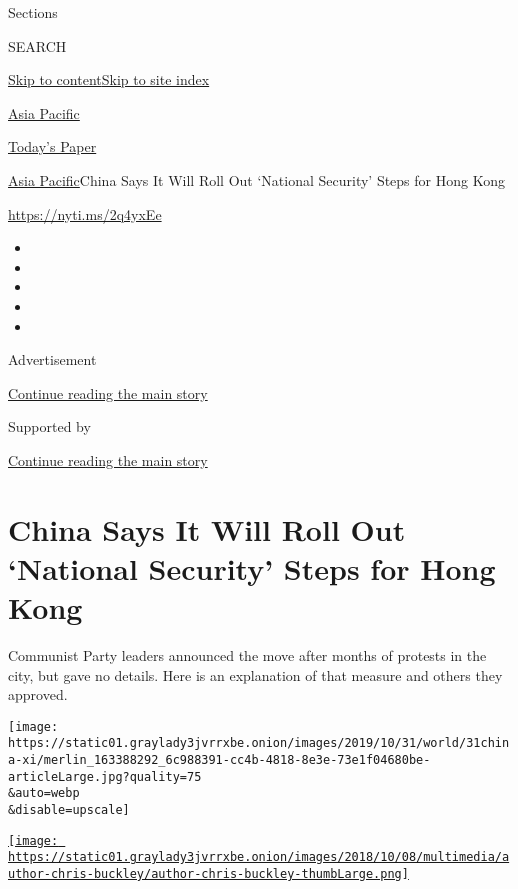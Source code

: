 Sections

SEARCH

\protect\hyperlink{site-content}{Skip to
content}\protect\hyperlink{site-index}{Skip to site index}

\href{https://www.nytimes3xbfgragh.onion/section/world/asia}{Asia
Pacific}

\href{https://myaccount.nytimes3xbfgragh.onion/auth/login?response_type=cookie\&client_id=vi}{}

\href{https://www.nytimes3xbfgragh.onion/section/todayspaper}{Today's
Paper}

\href{/section/world/asia}{Asia Pacific}\textbar{}China Says It Will
Roll Out `National Security' Steps for Hong Kong

\url{https://nyti.ms/2q4yxEe}

\begin{itemize}
\item
\item
\item
\item
\item
\end{itemize}

Advertisement

\protect\hyperlink{after-top}{Continue reading the main story}

Supported by

\protect\hyperlink{after-sponsor}{Continue reading the main story}

\hypertarget{china-says-it-will-roll-out-national-security-steps-for-hong-kong}{%
\section{China Says It Will Roll Out `National Security' Steps for Hong
Kong}\label{china-says-it-will-roll-out-national-security-steps-for-hong-kong}}

Communist Party leaders announced the move after months of protests in
the city, but gave no details. Here is an explanation of that measure
and others they approved.

\texttt{[image: https://static01.graylady3jvrrxbe.onion/images/2019/10/31/world/31china-xi/merlin\_163388292\_6c988391-cc4b-4818-8e3e-73e1f04680be-articleLarge.jpg?quality=75\\\&auto=webp\\\&disable=upscale]}

\href{https://www.nytimes3xbfgragh.onion/by/chris-buckley}{\texttt{[image: https://static01.graylady3jvrrxbe.onion/images/2018/10/08/multimedia/author-chris-buckley/author-chris-buckley-thumbLarge.png]}}

